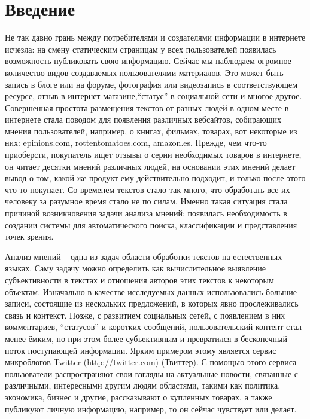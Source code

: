 
\section*{Введение}

Не так давно грань между потребителями и создателями информации в интернете
исчезла: на смену статическим страницам у всех пользователей появилась
возможность публиковать свою информацию. Сейчас мы наблюдаем огромное
количество видов создаваемых пользователями материалов. Это может быть запись
в блоге или на форуме, фотография или видеозапись в соответствующем
ресурсе, отзыв в интернет-магазине,``статус'' в социальной сети и многое другое.
Совершенная простота размещения текстов от разных людей в одном месте
в интернете стала поводом для появления различных вебсайтов, собирающих мнения
пользователей, например, о книгах, фильмах, товарах, вот некоторые из них:
epinions.com, rottentomatoes.com, amazon.es. Прежде, чем что-то приоберсти,
покупатель ищет отзывы о серии необходимых товаров в интернете, он читает
десятки мнений различных людей, на основании этих мнений делает вывод о том,
какой же продукт ему действительно подходит, и только после этого что-то покупает.
Со временем текстов стало так много, что обработать все их человеку за разумное
время стало не по силам. Именно такая ситуация стала причиной возникновения
задачи анализа мнений: появилась необходимость в создании системы для
автоматического поиска, классификации и представления точек зрения.

Анализ мнений -- одна из задач области обработки текстов на естественных
языках. Саму задачу можно определить как вычислительное выявление
субъективности в текстах и отношения авторов этих текстов к некоторым объектам.
Изначально в качестве исследуемых данных использовались большие записи,
состоящие из нескольких предложений, в которых явно прослеживались связь и
контекст. Позже, с развитием социальных сетей, с появлением в них комментариев,
``статусов'' и  коротких сообщений, пользовательский контент стал менее ёмким,
но при этом более субъективным и превратился в бесконечный поток поступающей
информации. Ярким примером этому является сервис микроблогов
Twitter (http://twitter.com) (Твиттер). С помощью этого сервиса пользователи распространяют
свои взгляды на актуальные новости, связанные с различными, интересными
другим людям областями, такими как политика, экономика, бизнес и другие,
рассказывают о купленных товарах, а также публикуют личную информацию, например,
то он сейчас чувствует или делает.

